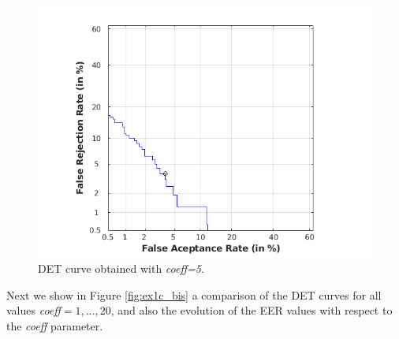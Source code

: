 \documentclass[11pt]{article}
\begin{document}
\begin{figure}[h!]
  \centering
    \includegraphics[scale=0.6]{img/1c_det}
    \caption{DET curve obtained with \textit{coeff=5}.}
    \label{fig:ex1c}
\end{figure}

Next we show in Figure \ref{fig:ex1c_bis} a comparison of the DET curves for all values \textit{coeff}$=1,\dots,20$, and also the evolution of the EER values with respect to the \textit{coeff} parameter.
\end{document}
